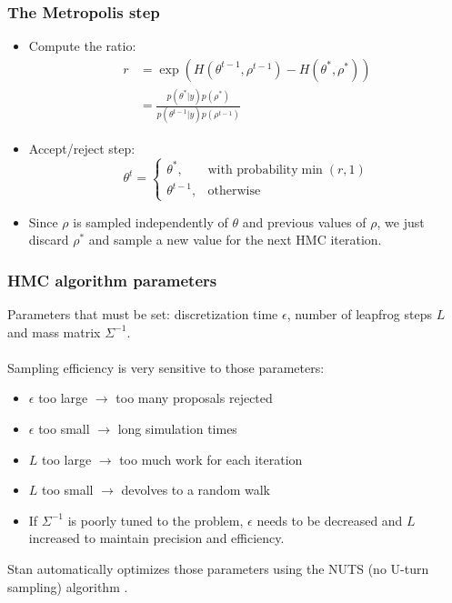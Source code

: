 \documentclass[handout]{beamer}
\begin{document}
\begin{frame}
  \frametitle{The Metropolis step}
  
  \begin{itemize}
  \item Compute the ratio:
    \begin{align*}
      r &= \exp\left(H\left(\theta^{t-1}, \rho^{t-1}\right) -
          H\left(\theta^*, \rho^*\right)\right) \\
        &= \frac{p\left(\theta^* | y\right) p\left(\rho^*\right)}{p\left(\theta^{t-1} | y\right) p\left(\rho^{t-1}\right)}
    \end{align*}
  \item Accept/reject step:
     $$ \theta^t = \left\{\begin{array}{ll}
                            \theta^*, & \text{with probability} \min\left(r, 1\right) \\
                            \theta^{t-1}, & \text{otherwise}
                          \end{array} \right. $$
\item Since $\rho$ is sampled independently of
                        $\theta$ and previous values of $\rho$, we
                        just discard $\rho^*$ and sample a new value
                        for the next HMC iteration.
\end{itemize}

\end{frame}

\begin{frame}
  \frametitle{HMC algorithm parameters}
  
Parameters that must be set: discretization time $\epsilon$, number of
leapfrog steps $L$ and mass matrix $\Sigma^{-1}$.\\ \ \\
Sampling efficiency is very sensitive to those parameters:
\begin{itemize}
\item $\epsilon$ too large $\rightarrow$ too many proposals rejected
\item $\epsilon$ too small $\rightarrow$ long simulation times
\item $L$ too large $\rightarrow$ too much work for each iteration
\item $L$ too small $\rightarrow$ devolves to a random walk
\item If $\Sigma^{-1}$ is poorly tuned to the problem, $\epsilon$
  needs to be decreased and $L$ increased to maintain precision and efficiency. 
\end{itemize}
Stan automatically optimizes those parameters using the NUTS (no
U-turn sampling) algorithm \cite{hoffman2014}. 

\end{frame}
\end{document}
